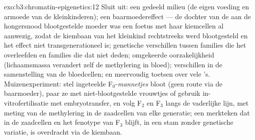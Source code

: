 \begin{solution}{exo:b3:chromatin-epigenetics:12}
Sluit uit: een gedeeld milieu (de eigen voeding en armoede van de
kleinkinderen); een baarmoedereffect --- de dochter van de aan de
hongersnood blootgestelde moeder was een foetus met haar kiemcellen al
aanwezig, zodat de kiembaan van het kleinkind rechtstreeks werd
blootgesteld en het effect niet transgenerationeel is; genetische
verschillen tussen families die het overleefden en families die dat
niet deden; omgekeerde oorzakelijkheid (lichaamsmassa verandert zelf
de methylering in bloed); verschillen in de samenstelling van de
bloedcellen; en meervoudig toetsen over vele 's. Muizenexperiment:
stel ingeteelde F$_0$-\emph{mannetjes} bloot (geen route via de
baarmoeder), paar ze met niet-blootgestelde vrouwtjes of gebruik
in-vitrofertilisatie met embryotransfer, en volg F$_2$ en F$_3$ langs
de vaderlijke lijn, met meting van de methylering in de zaadcellen van
elke generatie; een merkteken dat in de zaadcellen en het fenotype van
F$_3$ blijft, in een stam zonder genetische variatie, is overdracht
via de kiembaan.
\end{solution}

